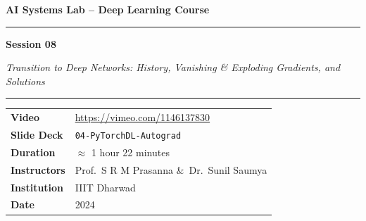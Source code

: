 \documentclass[12pt,a4paper]{article}
\begin{document}

\begin{titlepage}
  \centering
  \vspace*{2cm}
  {\Large\bfseries AI Systems Lab -- Deep Learning Course\par}
  \vspace{0.5cm}
  \rule{\linewidth}{1pt}
  \vspace{0.5cm}

  {\LARGE\bfseries Session 08\par}
  \vspace{0.3cm}
  {\large\itshape Transition to Deep Networks: History, Vanishing \&
   Exploding Gradients, and Solutions\par}

  \vspace{0.5cm}
  \rule{\linewidth}{1pt}
  \vspace{1cm}

  \begin{tabular}{ll}
    \textbf{Video}       & \url{https://vimeo.com/1146137830} \\[4pt]
    \textbf{Slide Deck}  & \texttt{04-PyTorchDL-Autograd} \\[4pt]
    \textbf{Duration}    & $\approx$ 1 hour 22 minutes \\[4pt]
    \textbf{Instructors} & Prof.\ S R M Prasanna \&\ Dr.\ Sunil Saumya \\[4pt]
    \textbf{Institution} & IIIT Dharwad \\[4pt]
    \textbf{Date}        & 2024 \\
  \end{tabular}

  \vspace{1.5cm}

  \begin{abstract}
    \noindent
    Session~8 marks the pivotal transition from shallow artificial neural
    networks (ANNs) to deep networks.  The lecture opens by recapping the
    historical arc from the single-layer perceptron through the
    multi-layer perceptron (MLP) and backpropagation, then explains the
    six converging factors that enabled the modern deep learning
    resurgence after the ``AI winter'' of the late 1990s.  The central
    topic is the \emph{vanishing/exploding gradient problem} (VGP/EGP):
    why sigmoid activations cause gradients to shrink exponentially as
    they propagate backwards through many layers, stalling learning in
    early layers.  A concrete four-layer numerical walkthrough
    demonstrates the phenomenon.  The session concludes with a
    three-step solution framework: (1)~identify the gradient problem,
    (2)~explore weight initialisation (greedy layer-wise unsupervised
    pre-training), and (3)~replace sigmoid with the Rectified Linear
    Unit (ReLU), whose constant derivative of~1 eliminates gradient
    decay.
  \end{abstract}


\end{titlepage}
\end{document}
